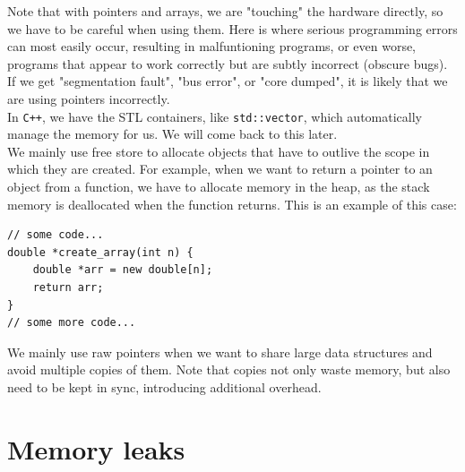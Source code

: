 Note that with pointers and arrays, we are "touching" the hardware directly, so we have to be careful when using them.
Here is where serious programming errors can most easily occur, resulting in malfuntioning programs, or even worse,
programs that appear to work correctly but are subtly incorrect (obscure bugs). If we get "segmentation fault",
"bus error", or "core dumped", it is likely that we are using pointers incorrectly.\\

In \texttt{C++}, we have the STL containers, like \texttt{std::vector}, which automatically manage 
the memory for us. We will come back to this later.\\

We mainly use free store to allocate objects that have to outlive the scope in which they are created. For example, when we
want to return a pointer to an object from a function, we have to allocate memory in the heap, as the stack memory is deallocated
when the function returns. This is an example of this case:\\

\begin{lstlisting}
// some code...
double *create_array(int n) {
    double *arr = new double[n];
    return arr;
}
// some more code...
\end{lstlisting}

We mainly use raw pointers when we want to share large data structures and avoid multiple copies of them. Note that copies not only waste
memory, but also need to be kept in sync, introducing additional overhead.

\section{Memory leaks}
